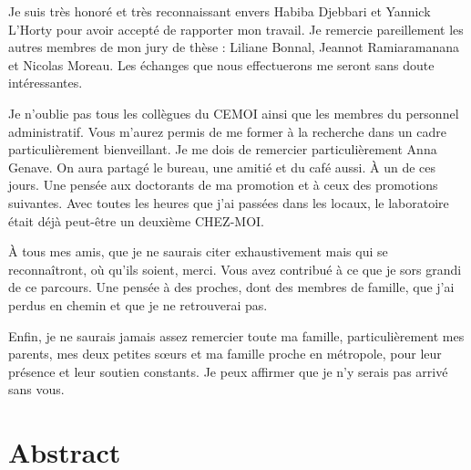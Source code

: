 \documentclass[
]{book}
\begin{document}
\quad Je suis très honoré et très reconnaissant envers Habiba Djebbari et Yannick L'Horty pour avoir accepté de rapporter mon travail. Je remercie pareillement les autres membres de mon jury de thèse : Liliane Bonnal, Jeannot Ramiaramanana et Nicolas Moreau. Les échanges que nous effectuerons me seront sans doute intéressantes.

\quad Je n'oublie pas tous les collègues du CEMOI ainsi que les membres du personnel administratif. Vous m'aurez permis de me former à la recherche dans un cadre particulièrement bienveillant. Je me dois de remercier particulièrement Anna Genave. On aura partagé le bureau, une amitié et du café aussi. À un de ces jours. Une pensée aux doctorants de ma promotion et à ceux des promotions suivantes. Avec toutes les heures que j'ai passées dans les locaux, le laboratoire était déjà peut-être un deuxième CHEZ-MOI.

\quad À tous mes amis, que je ne saurais citer exhaustivement mais qui se reconnaîtront, où qu'ils soient, merci. Vous avez contribué à ce que je sors grandi de ce parcours. Une pensée à des proches, dont des membres de famille, que j'ai perdus en chemin et que je ne retrouverai pas.

\quad Enfin, je ne saurais jamais assez remercier toute ma famille, particulièrement mes parents, mes deux petites sœurs et ma famille proche en métropole, pour leur présence et leur soutien constants. Je peux affirmer que je n'y serais pas arrivé sans vous.

\hypertarget{abstract}{%
\chapter*{Abstract}\label{abstract}}
\end{document}
